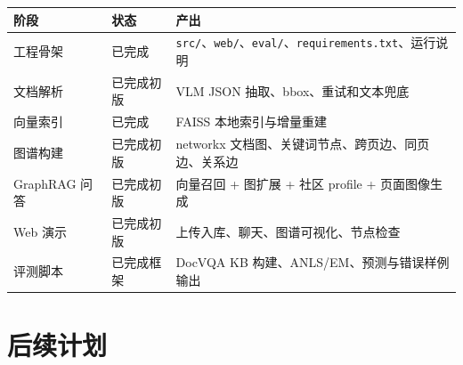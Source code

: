 \begin{longtable}[]{@{}
  >{\raggedright\arraybackslash}p{}
  >{\raggedright\arraybackslash}p{}
  >{\raggedright\arraybackslash}p{}@{}}
\toprule\noalign{}
\begin{minipage}[b]{\linewidth}\raggedright
阶段
\end{minipage} & \begin{minipage}[b]{\linewidth}\raggedright
状态
\end{minipage} & \begin{minipage}[b]{\linewidth}\raggedright
产出
\end{minipage} \\
\midrule\noalign{}
\endhead
\bottomrule\noalign{}
\endlastfoot
工程骨架 & 已完成 &
\texttt{src/}、\texttt{web/}、\texttt{eval/}、\texttt{requirements.txt}、运行说明 \\
文档解析 & 已完成初版 & VLM JSON 抽取、bbox、重试和文本兜底 \\
向量索引 & 已完成 & FAISS 本地索引与增量重建 \\
图谱构建 & 已完成初版 & networkx
文档图、关键词节点、跨页边、同页边、关系边 \\
GraphRAG 问答 & 已完成初版 & 向量召回 + 图扩展 + 社区 profile +
页面图像生成 \\
Web 演示 & 已完成初版 & 上传入库、聊天、图谱可视化、节点检查 \\
评测脚本 & 已完成框架 & DocVQA KB 构建、ANLS/EM、预测与错误样例输出 \\
\end{longtable}

\section{后续计划}\label{ux540eux7eedux8ba1ux5212}

